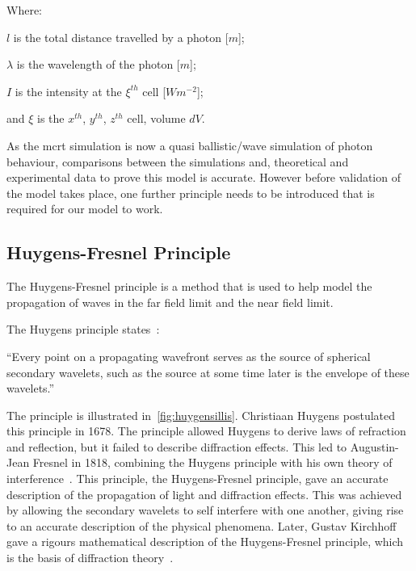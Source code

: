 \noindent Where:

\indent $l$ is the total distance travelled by a photon [$m$];

\indent $\lambda$ is the wavelength of the photon [$m$];

\indent $I$ is the intensity at the $\xi^{th}$ cell [$W m^{-2}$];

\indent and $\xi$ is the $x^{th}$, $y^{th}$, $z^{th}$ cell, volume $dV$.

\medskip

As the \gls*{mcrt} simulation is now a quasi ballistic/wave simulation of photon behaviour, comparisons between the simulations and, theoretical and experimental data to prove this model is accurate. However before validation of the model takes place, one further principle needs to be introduced that is required for our model to work.

\subsection{Huygens-Fresnel Principle}

The Huygens-Fresnel principle is a method that is used to help model the propagation of waves in the far field limit and the near field limit. 

The Huygens principle states~\cite{huygens2012treatise,hecht2017optics,huygens1900wave}: 

\medskip

``Every point on a propagating wavefront serves as the source of spherical secondary wavelets, such as the source at some time later is the envelope of these wavelets.''

\medskip

The principle is illustrated in~\cref{fig:huygensillis}. Christiaan Huygens postulated this principle in 1678.
The principle allowed Huygens to derive laws of refraction and reflection, but it failed to describe diffraction effects.
This led to Augustin-Jean Fresnel in 1818, combining the Huygens principle with his own theory of interference~\cite{fresnel1819memoire,huygens1900wave}.
This principle, the Huygens-Fresnel principle, gave an accurate description of the propagation of light and diffraction effects.
This was achieved by allowing the secondary wavelets to self interfere with one another, giving rise to an accurate description of the physical phenomena.
Later, Gustav Kirchhoff gave a rigours mathematical description of the Huygens-Fresnel principle, which is the basis of diffraction theory~\cite{kirchhoff1883ann,born2000principles}. 

